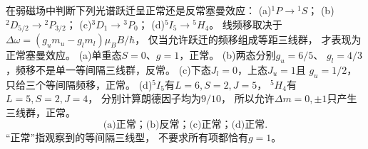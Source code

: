 在弱磁场中判断下列光谱跃迁呈正常还是反常塞曼效应：
(a)\({}^{1}P\to{}^{1}S\)；
(b)\({}^{2}D_{5/2}\to{}^{2}P_{3/2}\)；
(c)\({}^{3}D_1\to{}^{3}P_0\)；
(d)\({}^{5}I_5\to{}^{5}H_4\)。
\exsolution
线频移取决于
$\Delta\omega=(g_um_u-g_lm_l)\mu_BB/\hbar$，
仅当允许跃迁的频移组成等距三线群，
才表现为正常塞曼效应。
(a)单重态$S=0$、$g=1$，正常。
(b)两态分别$g_u=6/5$、
$g_l=4/3$，频移不是单一等间隔三线群，反常。
(c)下态$J_l=0$，上态$J_u=1$且
$g_u=1/2$，
只给三个等间隔频移，正常。
(d)\({}^{5}I_5\)有$L=6,S=2,J=5$，
\({}^{5}H_4\)有$L=5,S=2,J=4$，
分别计算朗德因子均为$9/10$，
所以允许$\Delta m=0,\pm1$只产生三线群，正常。
\[
 \boxed{\text{(a)正常；(b)反常；(c)正常；(d)正常}}.
\]
\excheck “正常”指观察到的等间隔三线型，
不要求所有项都恰有$g=1$。
